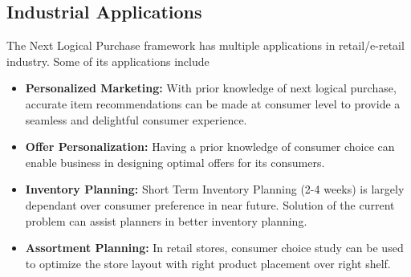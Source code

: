 \subsection{Industrial Applications}
The Next Logical Purchase framework has multiple applications in retail/e-retail industry. Some of its applications 
include
\begin{itemize}
\item {\bf Personalized Marketing:} With prior knowledge of next logical purchase, accurate item recommendations can be 
made at consumer level to provide a seamless and delightful consumer experience.
\item {\bf Offer Personalization:} Having a prior knowledge of consumer choice can enable 
business in designing optimal offers for its consumers.
\item {\bf Inventory Planning:} Short Term Inventory Planning (2-4 weeks) is largely dependant over 
consumer preference in near future. Solution of the current problem can assist planners in better inventory planning.
\item {\bf Assortment Planning:} In retail stores, consumer choice study can be used to optimize the store 
layout with right product placement over right shelf.
\end{itemize}

